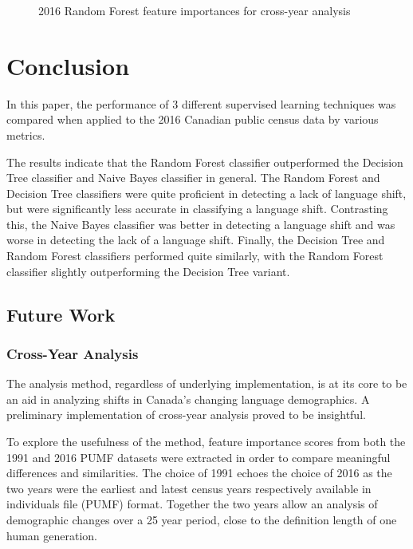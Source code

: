 \documentclass[10pt, conference, compsocconf]{IEEEtran}
\begin{document}
{\begin{figure}[!p]
{\begin{tabular}{llll}
  \end{tabular}}
  \caption{2016 Random Forest feature importances for cross-year analysis}
  \label{fig:2016_random_forest_importances}
\end{figure}
\clearpage
}

\section{Conclusion}
In this paper, the performance of 3 different supervised learning techniques was compared when applied to the 2016 Canadian public census data by various metrics.

The results indicate that the Random Forest classifier outperformed the Decision Tree classifier and Naive Bayes classifier in general. The Random Forest and Decision Tree classifiers were quite proficient in detecting a lack of language shift, but were significantly less accurate in classifying a language shift. Contrasting this, the Naive Bayes classifier was better in detecting a language shift and was worse in detecting the lack of a language shift. Finally, the Decision Tree and Random Forest classifiers performed quite similarly, with the Random Forest classifier slightly outperforming the Decision Tree variant.


\subsection{Future Work}

\subsubsection{Cross-Year Analysis}


The analysis method, regardless of underlying implementation, is at its core to be an aid in analyzing shifts in Canada's changing language demographics.  A preliminary implementation of cross-year analysis proved to be insightful.

To explore the usefulness of the method, feature importance scores from both the 1991 and 2016 PUMF datasets were extracted in order to compare meaningful differences and similarities.  The choice of 1991 echoes the choice of 2016 as the two years were the earliest and latest census years respectively available in individuals file (PUMF) format.  Together the two years allow an analysis of demographic changes over a 25 year period, close to the definition length of one human generation. \cite{generation}
\end{document}
